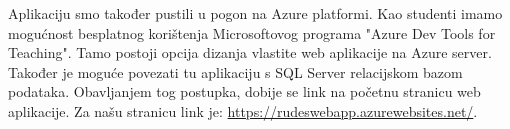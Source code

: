 		 	\textnormal{Aplikaciju smo također pustili u pogon na Azure platformi. Kao studenti imamo mogućnost besplatnog korištenja Microsoftovog programa "Azure Dev Tools for Teaching". Tamo postoji opcija dizanja vlastite web aplikacije na Azure server. Također je moguće povezati tu aplikaciju s SQL Server relacijskom bazom podataka. Obavljanjem tog postupka, dobije se link na početnu stranicu web aplikacije. Za našu stranicu link je: \href{https://rudeswebapp.azurewebsites.net/}{https://rudeswebapp.azurewebsites.net/}}.
			
			\eject 